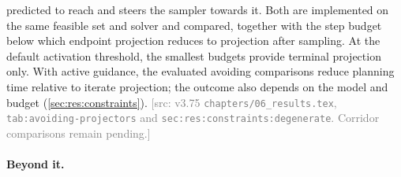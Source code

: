 \documentclass[headsepline,footsepline,footinclude=false,oneside,fontsize=11pt,paper=a4,listof=totoc,bibliography=totoc]{scrbook}
\theoremstyle{definition}
\theoremstyle{plain}
\theoremstyle{remark}
\newif\ifsubmission
\newcommand{\srcnote}[1]{\ifsubmission\else\textcolor{gray}{\footnotesize\textsf{[src: #1]}}\fi}
\begin{document}
\begin{enumerate}
    predicted to reach and steers the sampler towards it. Both are implemented on the same feasible set
    and solver and compared, together with the step budget below which endpoint projection reduces to
    projection after sampling. At the default activation threshold, the smallest budgets provide
    terminal projection only. With active guidance, the evaluated avoiding comparisons reduce
    planning time relative to iterate projection; the outcome also depends on the model and budget
    (\autoref{sec:res:constraints}).
    \srcnote{v3.75 \texttt{chapters/06\_results.tex}, \texttt{tab:avoiding-projectors} and
    \texttt{sec:res:constraints:degenerate}. Corridor comparisons remain pending.}
\end{enumerate}

\paragraph{Beyond it.}
\end{document}
